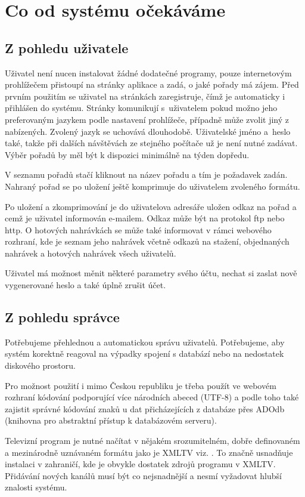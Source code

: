 \chapter{Co od systému očekáváme}
\section{Z pohledu uživatele}
Uživatel není nucen instalovat žádné dodatečné programy, pouze internetovým prohlížečem přistoupí na stránky aplikace a zadá, o jaké pořady má zájem. Před prvním použitím se uživatel na stránkách zaregistruje, čímž je automaticky i přihlášen do systému. Stránky komunikují s~uživatelem pokud možno jeho preferovaným jazykem podle nastavení prohlížeče, případně může zvolit jiný z nabízených. Zvolený jazyk se uchovává dlouhodobě. Uživatelské jméno a~heslo také, takže při dalších návštěvách ze stejného počítače už je není nutné zadávat. Výběr pořadů by měl být k dispozici minimálně na týden dopředu.

V seznamu pořadů stačí kliknout na název pořadu a tím je požadavek zadán. Nahraný pořad se po uložení ještě komprimuje do uživatelem zvoleného formátu.

Po uložení a zkomprimování je do uživatelova adresáře uložen odkaz na pořad a cemž je uživatel informován e-mailem. Odkaz může být na protokol ftp nebo http. O hotových nahrávkách se může také informovat v rámci webového rozhraní, kde je seznam jeho nahrávek včetně odkazů na stažení, objednaných nahrávek a hotových nahrávek všech uživatelů.

Uživatel má možnost měnit některé parametry svého účtu, nechat si zaslat nově vygenerované heslo a také úplně zrušit účet.

\section{Z pohledu správce}
Potřebujeme přehlednou a automatickou správu uživatelů. Potřebujeme, aby systém korektně reagoval na výpadky spojení s databází nebo na nedostatek diskového prostoru.

Pro možnost použití i mimo Českou republiku je třeba použít ve webovém rozhraní kódování podporující více národních abeced (UTF-8) a podle toho také zajistit správné kódování znaků u dat přicházejících z databáze přes ADOdb (knihovna pro abstraktní přístup k databázovém serveru). 

Televizní program je nutné načítat v nějakém srozumitelném, dobře definovaném a mezinárodně uznávaném formátu jako je XMLTV viz. \cite{xmltvURL}. To značně usnadňuje instalaci v zahraničí, kde je obvykle dostatek zdrojů programu v XMLTV. Přidávání nových kanálů musí být co nejsnadnější a nesmí vyžadovat hlubší znalosti systému.
